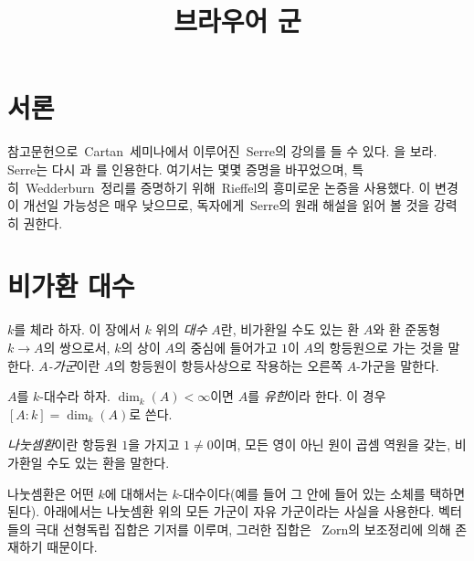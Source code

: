 

%


\title{브라우어 군}


\maketitle

\label{section-phantom}

\tableofcontents

\section{서론}
\label{section-introduction}

\noindent
참고문헌으로~Cartan~세미나에서 이루어진~Serre의 강의를 들 수 있다.
\cite{Serre-Cartan}을 보라. Serre는 다시
\cite{Deuring}과 \cite{ANT}를 인용한다. 여기서는 몇몇 증명을 바꾸었으며,
특히~Wedderburn~정리를 증명하기 위해~Rieffel의 흥미로운 논증을 사용했다.
이 변경이 개선일 가능성은 매우 낮으므로, 독자에게~Serre의 원래 해설을
읽어 볼 것을 강력히 권한다.


\section{비가환 대수}
\label{section-algebras}

\noindent
$k$를 체라 하자. 이 장에서 $k$ 위의 {\it 대수} $A$란, 비가환일 수도 있는
환 $A$와 환 준동형 $k \to A$의 쌍으로서, $k$의 상이 $A$의 중심에 들어가고
$1$이 $A$의 항등원으로 가는 것을 말한다. {\it $A$-가군}이란 $A$의
항등원이 항등사상으로 작용하는 오른쪽 $A$-가군을 말한다.

\begin{definition}
\label{definition-finite}
$A$를 $k$-대수라 하자. $\dim_k(A) < \infty$이면 $A$를 {\it 유한}이라 한다.
이 경우 $[A : k] = \dim_k(A)$로 쓴다.
\end{definition}

\begin{definition}
\label{definition-skew-field}
{\it 나눗셈환}이란 항등원 $1$을 가지고 $1 \not = 0$이며, 모든 영이 아닌
원이 곱셈 역원을 갖는, 비가환일 수도 있는 환을 말한다.
\end{definition}

\noindent
나눗셈환은 어떤 $k$에 대해서는 $k$-대수이다(예를 들어 그 안에 들어 있는
소체를 택하면 된다). 아래에서는 나눗셈환 위의 모든 가군이 자유 가군이라는
사실을 사용한다. 벡터들의 극대 선형독립 집합은 기저를 이루며, 그러한 집합은
~Zorn의 보조정리에 의해 존재하기 때문이다.

